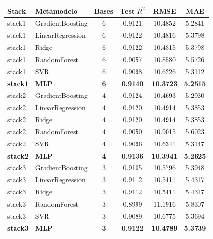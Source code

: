 \begin{table}
    \centering
    \small
    \footnotesize
    \begin{tabular}{llcccc}
        \hline
        \textbf{Stack} & \textbf{Metamodelo} & \textbf{Bases} & \textbf{Test $R^2$} & \textbf{RMSE} & \textbf{MAE} \\
        \hline
        stack1 & GradientBoosting & 6 & 0.9121 & 10.4852 & 5.2841 \\
        stack1 & LinearRegression & 6 & 0.9122 & 10.4816 & 5.3798 \\
        stack1 & Ridge            & 6 & 0.9122 & 10.4815 & 5.3798 \\
        stack1 & RandomForest     & 6 & 0.9057 & 10.8580 & 5.5726 \\
        stack1 & SVR              & 6 & 0.9098 & 10.6226 & 5.3112 \\
        \textbf{stack1} & \textbf{MLP} & \textbf{6} & \textbf{0.9140} & \textbf{10.3723} & \textbf{5.2515} \\
        \hline
        stack2 & GradientBoosting & 4 & 0.9124 & 10.4693 & 5.2930 \\
        stack2 & LinearRegression & 4 & 0.9120 & 10.4914 & 5.3853 \\
        stack2 & Ridge            & 4 & 0.9120 & 10.4914 & 5.3853 \\
        stack2 & RandomForest     & 4 & 0.9050 & 10.9015 & 5.6023 \\
        stack2 & SVR              & 4 & 0.9096 & 10.6341 & 5.3147 \\
        \textbf{stack2} & \textbf{MLP} & \textbf{4} & \textbf{0.9136} & \textbf{10.3941} & \textbf{5.2625} \\
        \hline
        stack3 & GradientBoosting & 3 & 0.9105 & 10.5796 & 5.3948 \\
        stack3 & LinearRegression & 3 & 0.9112 & 10.5411 & 5.4317 \\
        stack3 & Ridge            & 3 & 0.9112 & 10.5411 & 5.4317 \\
        stack3 & RandomForest     & 3 & 0.8999 & 11.1916 & 5.8307 \\
        stack3 & SVR              & 3 & 0.9089 & 10.6775 & 5.3694 \\
        \textbf{stack3} & \textbf{MLP} & \textbf{3} & \textbf{0.9122} & \textbf{10.4789} & \textbf{5.3739} \\
        \hline

\end{tabular}
\end{table}
